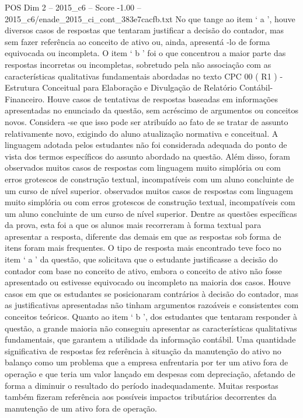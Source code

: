 \begin{textsample}{POS Dim 2 – 2015\_c6 – Score -1.00 – 2015\_c6/enade\_2015\_ci\_cont\_383e7cacfb.txt}
No que tange ao item ‘ a ’, houve diversos casos de respostas que tentaram justificar a decisão do contador, mas sem fazer referência ao conceito de ativo ou, ainda, apresentá -lo de forma equivocada ou incompleta.
O item ‘ b ’ foi o que concentrou a maior parte das respostas incorretas ou incompletas, sobretudo pela não associação com as características qualitativas fundamentais abordadas no texto CPC 00 ( R1 ) - Estrutura Conceitual para Elaboração e Divulgação de Relatório Contábil-Financeiro.
Houve casos de tentativas de respostas baseadas em informações apresentadas no enunciado da questão, sem acréscimo de argumentos ou conceitos novos.
Considera -se que isso pode ser atribuído ao fato de se tratar de assunto relativamente novo, exigindo do aluno atualização normativa e conceitual.
A linguagem adotada pelos estudantes não foi considerada adequada do ponto de vista dos termos específicos do assunto abordado na questão.
Além disso, foram observados muitos casos de respostas com linguagem muito simplória ou com erros grotescos de construção textual, incompatíveis com um aluno concluinte de um curso de nível superior. observados muitos casos de respostas com linguagem muito simplória ou com erros grotescos de construção textual, incompatíveis com um aluno concluinte de um curso de nível superior.
Dentre as questões específicas da prova, esta foi a que os alunos mais recorreram à forma textual para apresentar a resposta, diferente das demais em que as respostas sob forma de itens foram mais frequentes.
O tipo de resposta mais encontrado teve foco no item ‘ a ’ da questão, que solicitava que o estudante justificasse a decisão do contador com base no conceito de ativo, embora o conceito de ativo não fosse apresentado ou estivesse equivocado ou incompleto na maioria dos casos.
Houve casos em que os estudantes se posicionaram contrários à decisão do contador, mas as justificativas apresentadas não tinham argumentos razoáveis e consistentes com conceitos teóricos.
Quanto ao item ‘ b ’, dos estudantes que tentaram responder à questão, a grande maioria não conseguiu apresentar as características qualitativas fundamentais, que garantem a utilidade da informação contábil.
Uma quantidade significativa de respostas fez referência à situação da manutenção do ativo no balanço como um problema que a empresa enfrentaria por ter um ativo fora de operação e que teria um valor lançado em despesas com depreciação, afetando de forma a diminuir o resultado do período inadequadamente.
Muitas respostas também fizeram referência aos possíveis impactos tributários decorrentes da manutenção de um ativo fora de operação.

\end{textsample}
